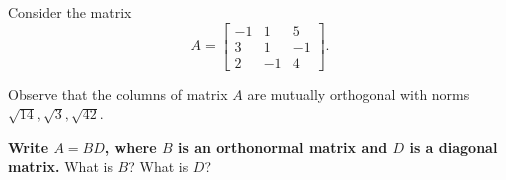 

\begin{enumerate}

\qitem  Consider the matrix $$A = \begin{bmatrix}
    -1 & 1 & 5 \\
    3 & 1 & -1 \\
    2 & -1 & 4
  \end{bmatrix}. $$

Observe that the columns of matrix $A$ are mutually orthogonal with
norms $\sqrt{14}, \sqrt{3}, \sqrt{42}$. %




\textbf{Write $A = BD$, where $B$ is an orthonormal matrix and $D$ is a
  diagonal matrix.} What is $B$? What is $D$?

\ws{
  \vspace{250px}
}


\end{enumerate}
